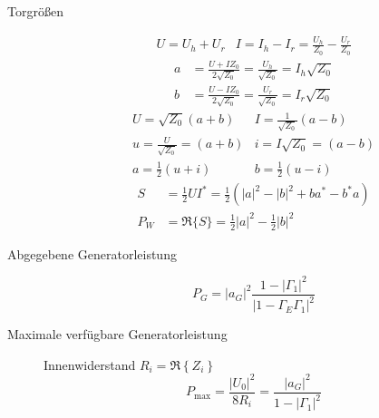 \begin{description}
\item[Torgrößen]
\renewcommand{\arraystretch}{1.6}
\begin{equation*}
\begin{array}{cc}
U = U_h + U_r &  I = I_h - I_r = \frac{U_h}{Z_0} - \frac{U_r}{Z_0}
\end{array}
\end{equation*}
\begin{align*}
a &= \frac{U + I Z_0}{2 \sqrt{Z_0}} = \frac{U_h}{\sqrt{Z_0}} = I_h \sqrt{Z_0} \\
b &= \frac{U - I Z_0}{2 \sqrt{Z_0}} = \frac{U_r}{\sqrt{Z_0}} = I_r \sqrt{Z_0}
\end{align*}
\begin{equation*}
\begin{array}{cc}
U = \sqrt{Z_0} (a + b) & I = \frac{1}{\sqrt{Z_0}} (a - b) \\
u = \frac{U}{\sqrt{Z_0}} = (a + b) & i = I \sqrt{Z_0} = (a - b) \\
a = \frac{1}{2} (u+i) & b = \frac{1}{2} (u-i)
\end{array}
\end{equation*}
\begin{align*}
S &= \frac{1}{2} U I^* = \frac{1}{2}\left( |a|^2 - |b|^2 + ba^* - b^*a \right) \\
P_W &= \Re\{S\} = \frac{1}{2} |a|^2 - \frac{1}{2} |b|^2
\end{align*}

\item[Abgegebene Generatorleistung]
\begin{equation*}
P_G = |a_G|^2 \frac{1-|\Gamma_1|^2}{|1-\Gamma_E\Gamma_1|^2}
\end{equation*}

\item[Maximale verfügbare Generatorleistung] Innenwiderstand $R_i = \Re\left\{Z_i\right\}$
\begin{equation*}
P_\text{max} = \frac{|U_0|^2}{8R_i} = \frac{|a_G|^2}{1-|\Gamma_1|^2}
\end{equation*}


\end{description}

